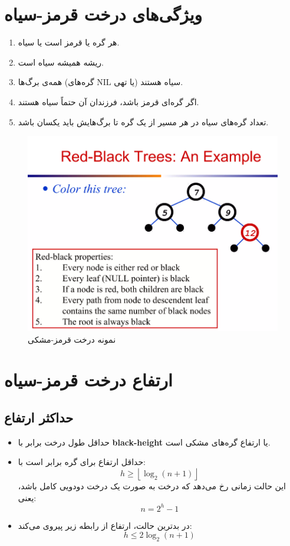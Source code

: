 \documentclass[a4paper,12pt]{article}
\begin{document}
	\section{ویژگی‌های درخت قرمز-سیاه}
	\begin{enumerate}
		\item هر گره یا قرمز است یا سیاه.
		\item ریشه همیشه سیاه است.
		\item همه‌ی برگ‌ها (گره‌های NIL یا تهی) سیاه هستند.
		\item اگر گره‌ای قرمز باشد، فرزندان آن حتماً سیاه هستند.
		\item تعداد گره‌های سیاه در هر مسیر از یک گره تا برگ‌هایش باید یکسان باشد.
	\end{enumerate}
	
	
	\begin{figure}[H]
		\centering
		\includegraphics[width=1\textwidth]{img/redblack-example.png}
		\caption{نمونه درخت قرمز-مشکی}
	\end{figure}
	
	
	
	\section{ارتفاع درخت قرمز-سیاه}
	\subsection*{حداکثر ارتفاع}
	\begin{itemize}
		\item حداقل طول درخت  برابر با \textbf{black-height} یا ارتفاع گره‌های مشکی است.
		\item حداقل ارتفاع  برای  گره برابر است با:
		\[
		h \geq \left\lfloor \log_2(n+1) \right\rfloor
		\]
		این حالت زمانی رخ می‌دهد که درخت  به صورت یک درخت دودویی کامل باشد، یعنی:
		\[
		n = 2^h - 1
		\]
		\item در بدترین حالت، ارتفاع  از رابطه زیر پیروی می‌کند:
		\[
		h \leq 2\log_2(n+1)
		\]
	\end{itemize}
	
\end{document}
